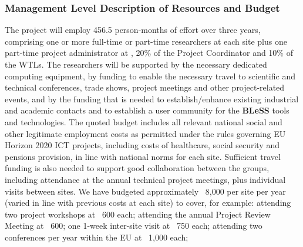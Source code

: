 \documentclass[a4paper,11pt]{article}
\newcommand{\project}[1]{\textbf{#1}\xspace}
\newcommand{\BLESS}{\project{BLeSS}}
\newcommand{\TheProject}{\BLESS}
\begin{document}


\subsubsection{Management Level Description of Resources and Budget}
\vspace{-6pt}


The project will employ 456.5 person-months of effort over three
years, comprising one or more full-time or part-time researchers at each site
plus one part-time project administrator at \SAshort{}, %
20\% of the Project Coordinator and 10\% of the WTLs. The researchers will be supported by
the necessary dedicated computing equipment,
by funding to enable the necessary travel to scientific and technical conferences, trade shows, 
project meetings and other project-related events, and by the funding that is needed to establish/enhance existing
industrial and academic contacts and to establish a user
community for the \TheProject{} tools and technologies.
%
The quoted budget includes all relevant national social and
other legitimate employment costs as permitted under the rules
governing EU Horizon 2020 ICT projects, including costs of
healthcare, social security and pensions provision, in line with national norms for each site.
%
Sufficient travel funding is also needed to support good
collaboration between the groups, including attendance at the
annual technical project meetings, plus individual visits between
sites. We have budgeted approximately \euros{}~8,000 per
site per year (varied in line with previous
costs at each site)  to cover, for example:
attending two project workshops at \euros{}~600 each;
attending the annual Project Review Meeting at \euros{}~600;
one 1-week inter-site visit at \euros{}~750 each;
attending two conferences per year within the EU at \euros{}~1,000 each;
\end{document}
